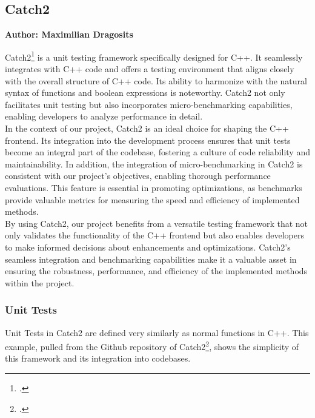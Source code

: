 \subsection{Catch2}
\textbf{Author: Maximilian Dragosits}

Catch2\footcite{catch2_git} is a unit testing framework specifically designed for C++. It seamlessly integrates with C++ code and offers a testing environment 
that aligns closely with the overall structure of C++ code. Its ability to harmonize with the natural syntax of functions and boolean expressions is noteworthy. 
Catch2 not only facilitates unit testing but also incorporates micro-benchmarking capabilities, enabling developers to analyze performance in detail.\\

In the context of our project, Catch2 is an ideal choice for shaping the C++ frontend. Its integration into the development process ensures that unit tests 
become an integral part of the codebase, fostering a culture of code reliability and maintainability. In addition, the integration of micro-benchmarking in Catch2 
is consistent with our project's objectives, enabling thorough performance evaluations. This feature is essential in promoting optimizations, as benchmarks provide 
valuable metrics for measuring the speed and efficiency of implemented methods.\\

By using Catch2, our project benefits from a versatile testing framework that not only validates the functionality of the C++ frontend but also enables developers 
to make informed decisions about enhancements and optimizations. Catch2's seamless integration and benchmarking capabilities make it a valuable asset in ensuring 
the robustness, performance, and efficiency of the implemented methods within the project.\\

\subsubsection{Unit Tests}

Unit Tests in Catch2 are defined very similarly as normal functions in C++. This example, pulled from the Github repository of Catch2\footcite{catch2_git}, shows the simplicity of
this framework and its integration into codebases.

